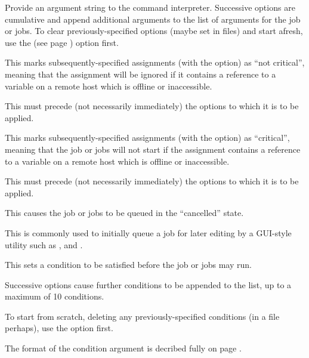 
Provide an argument string to the command interpreter. Successive  options are cumulative and
append additional arguments to the list of arguments for the job or jobs. To clear previously-specified options (maybe set in
\configurationfile{} files) and start afresh, use the  (see page \pageref{btr:cancarg}) option first.


This marks subsequently-specified assignments (with the  option) as ``not critical'', meaning that the assignment will be ignored if
it contains a reference to a variable on a remote host which is offline or inaccessible.

This must precede (not necessarily immediately) the  options to which it is to be applied.


This marks subsequently-specified assignments (with the  option) as ``critical'', meaning that the job or jobs
will not start if the assignment contains a reference to a variable on a remote host which is offline or inaccessible.

This must precede (not necessarily immediately) the  options to which it is to be applied.


This causes the job or jobs to be queued in the ``cancelled'' state.

This is commonly used to initially queue a job for later editing by a GUI-style utility such as \PrBtq{}, \PrXbtq{} and \PrXmbtq{}.


This sets a condition to be satisfied before the job or jobs may run.

Successive  options cause further conditions to be appended to the list, up to a maximum of 10 conditions.

To start from scratch, deleting any previously-specified conditions (in a \configurationfile{} file perhaps), use the
 option first.

The format of the condition argument is decribed fully on page \pageref{btr:condfmt}.


